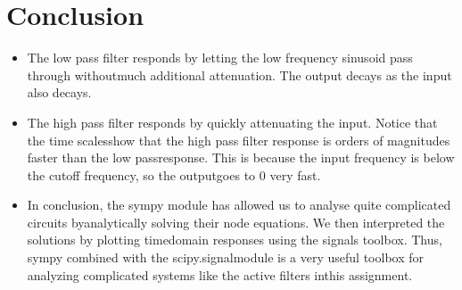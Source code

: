 \documentclass[11pt, a4paper]{article}
\begin{document}
\section*{Conclusion}
\begin{itemize}
    \item  The low pass filter responds by letting the low frequency sinusoid pass through withoutmuch additional attenuation. The output decays as the input also decays.
    \item The high pass filter responds by quickly attenuating the input.  Notice that the time scalesshow  that  the  high  pass  filter  response  is  orders  of  magnitudes  faster  than  the  low  passresponse.  This is because the input frequency is below the cutoff frequency, so the outputgoes to 0 very fast.
    \item In conclusion, the sympy module has allowed us to analyse quite complicated circuits byanalytically solving their node equations. We then interpreted the solutions by plotting timedomain responses using the signals toolbox.  Thus, sympy combined with the scipy.signalmodule is a very useful toolbox for analyzing complicated systems like the active filters inthis assignment.
\end{itemize}  
\end{document}
